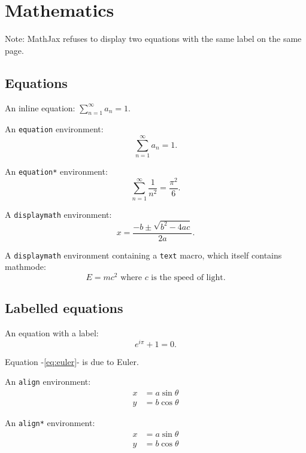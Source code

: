 
\chapter{Mathematics}

Note: MathJax refuses to display two equations with the same label on the same page. 

\section*{Equations}

An inline equation: $\sum_{n=1}^{\infty} a_n = 1$.

An \texttt{equation} environment:
\begin{equation}
\sum_{n=1}^{\infty} a_n = 1.
\end{equation}

An \texttt{equation*} environment:
\begin{equation*}
\sum_{n=1}^{\infty}\frac{1}{n^2} = \frac{\pi^2}{6}.
\end{equation*}

A \texttt{displaymath} environment:%
\[
x = \frac{-b\pm\sqrt{b^2-4ac}}{2a}.
\]

A \texttt{displaymath} environment containing a \texttt{text} macro, which itself contains mathmode:
\[
E=mc^2 \text{ where $c$ is the speed of light}.
\]


\section*{Labelled equations}


An equation with a label:
\begin{equation}\label{eq:euler}
e^{i\pi}+1=0.
\end{equation}

Equation -\eqref{eq:euler}- is due to Euler.

An \texttt{align} environment:
\begin{align}\label{eq:ellipse}
x & = a\sin\theta \\
y & = b\cos\theta
\end{align}

\bigskip
An \texttt{align*} environment:
\begin{align*}
x & = a\sin\theta \\
y & = b\cos\theta
\end{align*}

